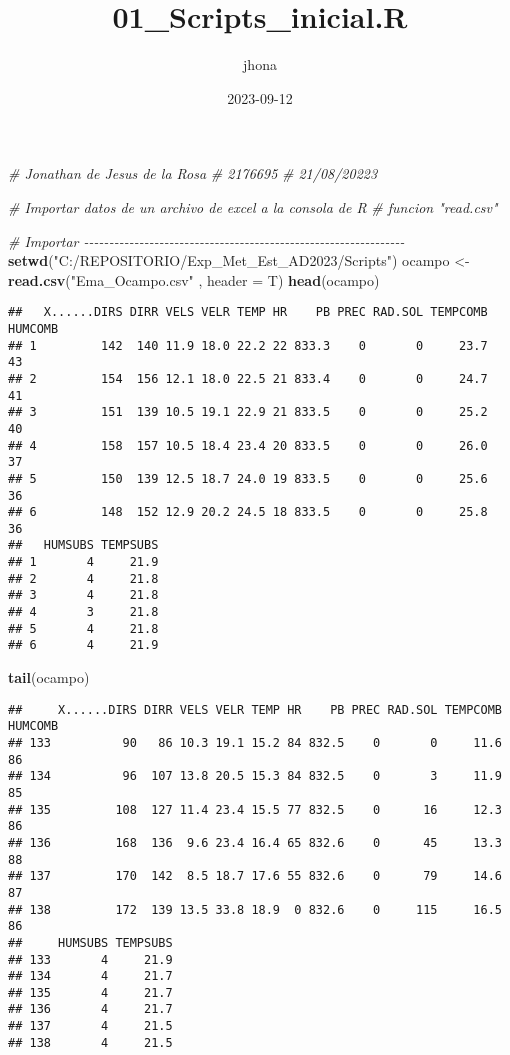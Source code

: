 \documentclass[
]{article}
\title{01\_Scripts\_inicial.R}
\author{jhona}
\date{2023-09-12}
\newenvironment{Shaded}{\begin{snugshade}}{\end{snugshade}}
\newcommand{\AttributeTok}[1]{\textcolor[rgb]{0.13,0.29,0.53}{#1}}
\newcommand{\CommentTok}[1]{\textcolor[rgb]{0.56,0.35,0.01}{\textit{#1}}}
\newcommand{\FunctionTok}[1]{\textcolor[rgb]{0.13,0.29,0.53}{\textbf{#1}}}
\newcommand{\NormalTok}[1]{#1}
\newcommand{\OtherTok}[1]{\textcolor[rgb]{0.56,0.35,0.01}{#1}}
\newcommand{\StringTok}[1]{\textcolor[rgb]{0.31,0.60,0.02}{#1}}
\begin{document}
\maketitle

\begin{Shaded}
\begin{Highlighting}[]
\CommentTok{\# Jonathan de Jesus de la Rosa}
\CommentTok{\# 2176695}
\CommentTok{\# 21/08/20223}

\CommentTok{\# Importar datos de un archivo de excel a la consola de R}
\CommentTok{\# funcion "read.csv"}

\CommentTok{\# Importar {-}{-}{-}{-}{-}{-}{-}{-}{-}{-}{-}{-}{-}{-}{-}{-}{-}{-}{-}{-}{-}{-}{-}{-}{-}{-}{-}{-}{-}{-}{-}{-}{-}{-}{-}{-}{-}{-}{-}{-}{-}{-}{-}{-}{-}{-}{-}{-}{-}{-}{-}{-}{-}{-}{-}{-}{-}{-}{-}{-}{-}{-}{-}{-}}
\FunctionTok{setwd}\NormalTok{(}\StringTok{"C:/REPOSITORIO/Exp\_Met\_Est\_AD2023/Scripts"}\NormalTok{)}
\NormalTok{ocampo }\OtherTok{\textless{}{-}} \FunctionTok{read.csv}\NormalTok{(}\StringTok{"Ema\_Ocampo.csv"}\NormalTok{ , }\AttributeTok{header =}\NormalTok{ T)}
\FunctionTok{head}\NormalTok{(ocampo)}
\end{Highlighting}
\end{Shaded}

\begin{verbatim}
##   X......DIRS DIRR VELS VELR TEMP HR    PB PREC RAD.SOL TEMPCOMB HUMCOMB
## 1         142  140 11.9 18.0 22.2 22 833.3    0       0     23.7      43
## 2         154  156 12.1 18.0 22.5 21 833.4    0       0     24.7      41
## 3         151  139 10.5 19.1 22.9 21 833.5    0       0     25.2      40
## 4         158  157 10.5 18.4 23.4 20 833.5    0       0     26.0      37
## 5         150  139 12.5 18.7 24.0 19 833.5    0       0     25.6      36
## 6         148  152 12.9 20.2 24.5 18 833.5    0       0     25.8      36
##   HUMSUBS TEMPSUBS
## 1       4     21.9
## 2       4     21.8
## 3       4     21.8
## 4       3     21.8
## 5       4     21.8
## 6       4     21.9
\end{verbatim}

\begin{Shaded}
\begin{Highlighting}[]
\FunctionTok{tail}\NormalTok{(ocampo)}
\end{Highlighting}
\end{Shaded}

\begin{verbatim}
##     X......DIRS DIRR VELS VELR TEMP HR    PB PREC RAD.SOL TEMPCOMB HUMCOMB
## 133          90   86 10.3 19.1 15.2 84 832.5    0       0     11.6      86
## 134          96  107 13.8 20.5 15.3 84 832.5    0       3     11.9      85
## 135         108  127 11.4 23.4 15.5 77 832.5    0      16     12.3      86
## 136         168  136  9.6 23.4 16.4 65 832.6    0      45     13.3      88
## 137         170  142  8.5 18.7 17.6 55 832.6    0      79     14.6      87
## 138         172  139 13.5 33.8 18.9  0 832.6    0     115     16.5      86
##     HUMSUBS TEMPSUBS
## 133       4     21.9
## 134       4     21.7
## 135       4     21.7
## 136       4     21.7
## 137       4     21.5
## 138       4     21.5
\end{verbatim}
\end{document}
